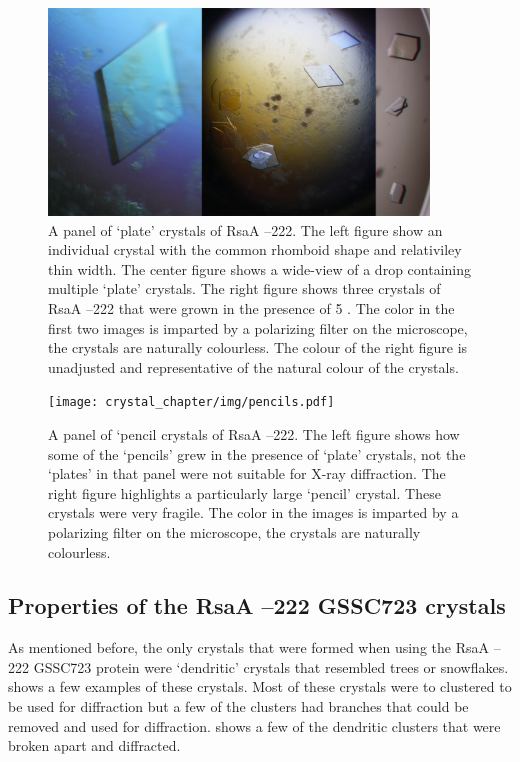 \begin{figure}[htb]
  	\begin{center}
   		\includegraphics[width=0.9\textwidth]{crystal_chapter/img/goodxtal.jpg}
   	\end{center}
   	\caption[Panel of well diffracting `plate' crystals of RsaA --222]{A panel of `plate' crystals of RsaA --222. The left figure show an individual crystal with the common rhomboid shape and relativiley thin width. The center figure shows a wide-view of a drop containing multiple `plate' crystals. The right figure shows three crystals of RsaA --222 that were grown in the presence of 5 \millimolar{} . The color in the first two images is imparted by a polarizing filter on the microscope, the crystals are naturally colourless. The colour of the right figure is unadjusted and representative of the natural colour of the crystals.}
   	\label{fig:crystal-panel}
\end{figure}   
\begin{figure}[htb]
  	\begin{center}
   		\texttt{[image: crystal\_chapter/img/pencils.pdf]}
   	\end{center}
   	\caption[A panel of `pencil crystals of RsaA --222']{A panel of `pencil crystals of RsaA --222. The left figure shows how some of the `pencils' grew in the presence of `plate' crystals, not the `plates' in that panel were not suitable for X-ray diffraction. The right figure highlights a particularly large `pencil' crystal. These crystals were very fragile.  The color in the images is imparted by a polarizing filter on the microscope, the crystals are naturally colourless.} 
   	\label{fig:pencils}
\end{figure}   

\subsection{Properties of the RsaA --222 GSSC723 crystals}\label{sec:properties-rsaa-del}
As mentioned before, the only crystals that were formed when using the RsaA --222 GSSC723 protein were `dendritic' crystals that resembled trees or snowflakes.  shows a few examples of these crystals. Most of these crystals were to clustered to be used for diffraction but a few of the clusters had branches that could be removed and used for diffraction.  shows a few of the dendritic clusters that were broken apart and diffracted. 

